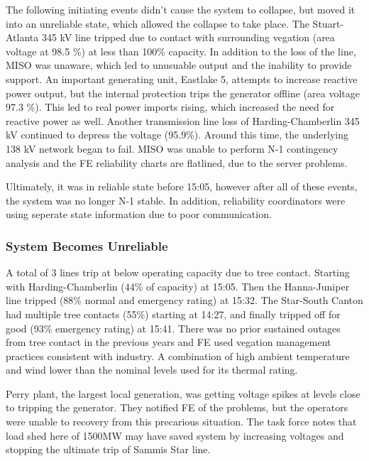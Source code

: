The following initiating events didn't cause the system to collapse, but moved it into an unreliable state, which allowed the collapse to take place. The Stuart-Atlanta 345 kV line tripped due to contact with surrounding vegation (area voltage at 98.5 \%) at less than 100\% capacity.  In addition to the loss of the line, MISO was unaware, which led to unusuable output and the inability to provide support.  An important generating unit, Eastlake 5, attempts to increase reactive power output, but the internal protection trips the generator offline (area voltage 97.3 \%).  This led to real power imports rising, which increased the need for reactive power as well.  Another transmission line loss of Harding-Chamberlin 345 kV continued to depress the voltage (95.9\%).  Around this time, the underlying 138 kV network began to fail.   MISO was unable to perform N-1 contingency analysis and the FE reliability charts are flatlined, due to the server problems.

Ultimately, it was in reliable state before 15:05, however after all of these events, the system was no longer N-1 stable.  In addition, reliability coordinators were using seperate state information due to poor communication.  

\subsubsection{System Becomes Unreliable}

A total of 3 lines trip at below operating capacity due to tree contact.  Starting with Harding-Chamberlin (44\% of capacity) at 15:05.  Then the Hanna-Juniper line tripped (88\% normal and emergency rating) at 15:32.  The Star-South Canton had multiple tree contacts (55\%) starting at 14:27, and finally tripped off for good (93\% emergency rating)  at 15:41.  There was no prior sustained outages from tree contact in the previous years and FE used vegation management practices consistent with industry.  A combination of high ambient temperature and wind lower than the nominal levels used for its thermal rating.   

Perry plant, the largest local generation, was getting voltage spikes at levels close to tripping the generator.  They notified FE of the problems, but the operators were unable to recovery from this precarious situation.  The task force notes that load shed here of 1500MW may have saved system by increasing voltages and stopping the ultimate trip of Sammis Star line.

